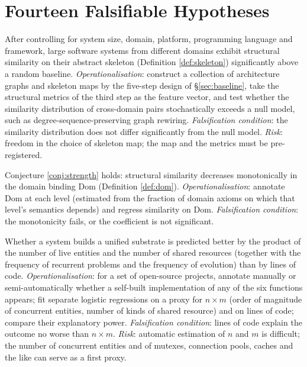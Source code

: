 \section{Fourteen Falsifiable Hypotheses}

\begin{hypothesis}\label{hyp:h1}
After controlling for system size, domain, platform, programming language and framework,
large software systems from different domains exhibit structural similarity on their
abstract skeleton (Definition \ref{def:skeleton}) significantly above a random baseline.
\emph{Operationalisation}: construct a collection of architecture graphs and skeleton maps
by the five-step design of \S\ref{sec:baseline}, take the structural metrics of the third
step as the feature vector, and test whether the similarity distribution of cross-domain
pairs stochastically exceeds a null model, such as degree-sequence-preserving graph
rewiring.
\emph{Falsification condition}: the similarity distribution does not differ significantly
from the null model.
\emph{Risk}: freedom in the choice of skeleton map; the map and the metrics must be
pre-registered.
\end{hypothesis}

\begin{hypothesis}\label{hyp:h2}
Conjecture \ref{conj:strength} holds: structural similarity decreases monotonically in the
domain binding $\mathrm{Dom}$ (Definition \ref{def:dom}).
\emph{Operationalisation}: annotate $\mathrm{Dom}$ at each level (estimated from the
fraction of domain axioms on which that level's semantics depends) and regress similarity
on $\mathrm{Dom}$.
\emph{Falsification condition}: the monotonicity fails, or the coefficient is not
significant.
\end{hypothesis}

\begin{hypothesis}\label{hyp:h3}
Whether a system builds a unified substrate is predicted better by the product of the
number of live entities and the number of shared resources (together with the frequency of
recurrent problems and the frequency of evolution) than by lines of code.
\emph{Operationalisation}: for a set of open-source projects, annotate manually or
semi-automatically whether a self-built implementation of any of the six functions appears;
fit separate logistic regressions on a proxy for $n \times m$ (order of magnitude of
concurrent entities, number of kinds of shared resource) and on lines of code; compare
their explanatory power.
\emph{Falsification condition}: lines of code explain the outcome no worse than
$n \times m$.
\emph{Risk}: automatic estimation of $n$ and $m$ is difficult; the number of concurrent
entities and of mutexes, connection pools, caches and the like can serve as a first proxy.
\end{hypothesis}

